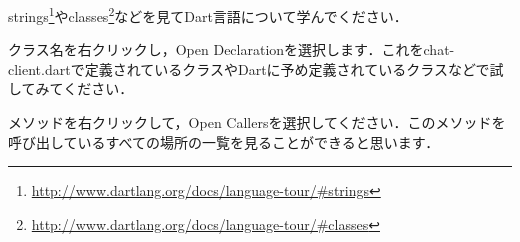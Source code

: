 strings\footnote{\url{http://www.dartlang.org/docs/language-tour/#strings}}やclasses\footnote{\url{http://www.dartlang.org/docs/language-tour/#classes}}などを見てDart言語について学んでください．

クラス名を右クリックし，Open Declarationを選択します．これをchat-client.dartで定義されているクラスやDartに予め定義されているクラスなどで試してみてください．


メソッドを右クリックして，Open Callersを選択してください．このメソッドを呼び出しているすべての場所の一覧を見ることができると思います．


\clearpage
